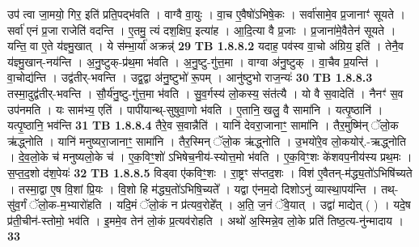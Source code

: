 \documentclass[17pt]{extarticle}
\begin{document}
                  उप॑ त्वा जा॒मयो॒ गिर॒ इति॑ प्रति॒पद्भ॑वति । वाग्वै वा॒युः । वा॒च ए॒वैषो॑ऽभिषे॒कः । सर्वा॑सामे॒व प्र॒जानाꣳ॑ सूयते । सर्वा॑ एनं प्र॒जा राजेति॑ वदन्ति । ए॒तमु॒ त्यं दश॒क्षिप॒ इत्या॑ह । आ॒दि॒त्या वै प्र॒जाः । प्र॒जाना॑मे॒वैतेन॑ सूयते । यन्ति॒ वा ए॒ते य॑ज्ञ्मु॒खात् । ये स॑म्भा॒र्या॑ अक्रन्न्॑ \textbf{ 29} \newline
                  \newline
                                \textbf{ TB 1.8.8.2} \newline
                  यदाह॒ पव॑स्व वा॒चो अ॑ग्रिय॒ इति॑ । तेनै॒व य॑ज्ञ्मु॒खान्-नय॑न्ति । अ॒नु॒ष्टुक्-प्र॑थ॒मा भ॑वति । अ॒नु॒ष्टु-गु॑त्त॒मा । वाग्वा अ॑नु॒ष्टुक् । वा॒चैव प्र॒यन्ति॑ । वा॒चोद्य॑न्ति । उद्व॑तीर्-भवन्ति । उद्व॒द्वा अ॑नु॒ष्टुभो॑ रू॒पम् । आनु॑ष्टुभो राज॒न्यः॑ \textbf{ 30} \newline
                  \newline
                                \textbf{ TB 1.8.8.3} \newline
                  तस्मा॒दुद्व॑तीर्-भवन्ति । सौ॒र्य॑नु॒ष्टु-गु॑त्त॒मा भ॑वति । सु॒व॒र्गस्य॑ लो॒कस्य॒ संत॑त्यै । यो वै स॒वादेति॑ । नैनꣳ॑ स॒व उप॑नमति । यः साम॑भ्य॒ एति॑ । पापी॑यान्थ्-सुषुवा॒णो भ॑वति । ए॒तानि॒ खलु॒ वै सामा॑नि । यत्पृ॒ष्ठानि॑ । यत्पृ॒ष्ठानि॒ भव॑न्ति \textbf{ 31} \newline
                  \newline
                                \textbf{ TB 1.8.8.4} \newline
                  तैरे॒व स॒वान्नैति॑ । यानि॑ देवरा॒जानाꣳ॒॒ सामा॑नि । तैर॒मुष्मि॑न् ॅलो॒क ऋ॑द्ध्नोति । यानि॑ मनुष्यरा॒जानाꣳ॒॒ सामा॑नि । तैर॒स्मिन् ॅलो॒क ऋ॑द्ध्नोति । उ॒भयो॑रे॒व लो॒कयोर्॑.-ऋद्ध्नोति । दे॒व॒लो॒के च॑ मनुष्यलो॒के च॑ । ए॒क॒विꣳ॒॒शो॑ ऽभिषेच॒नीय॑-स्योत्त॒मो भ॑वति । ए॒क॒विꣳ॒॒शः के॑शवप॒नीय॑स्य प्रथ॒मः । स॒प्त॒द॒शो द॑श॒पेयः॑ \textbf{ 32} \newline
                  \newline
                                \textbf{ TB 1.8.8.5} \newline
                  विड्वा ए॑कविꣳ॒॒शः । रा॒ष्ट्रꣳ स॑प्तद॒शः । विश॑ ए॒वैतन्-म॑द्ध्य॒तो॑ऽभिषि॑च्यते । तस्मा॒द्वा ए॒ष वि॒शां प्रि॒यः । वि॒शो हि म॑द्ध्य॒तो॑ऽभिषि॒च्यते᳚ । यद्वा ए॑नम॒दो दिशोऽनु॑ व्यास्था॒पय॑न्ति । तथ्-सु॑व॒र्गं ॅलो॒क-म॒भ्यारो॑हति । यदि॒मं ॅलो॒कं न प्र॑त्यव॒रोहे᳚त् । अ॒ति॒ ज॒नं ॅवे॒यात् । उद्वा॑ माद्येत् ( ) । यदे॒ष प्र॑ती॒चीन॑-स्तोमो॒ भव॑ति । इ॒ममे॒व तेन॑ लो॒कं प्र॒त्यव॑रोहति । अथो॑ अ॒स्मिन्ने॒व लो॒के प्रति॑ तिष्ठ॒त्य-नु॑न्मादाय । \textbf{ 33} \newline
                  \newline
\end{document}
